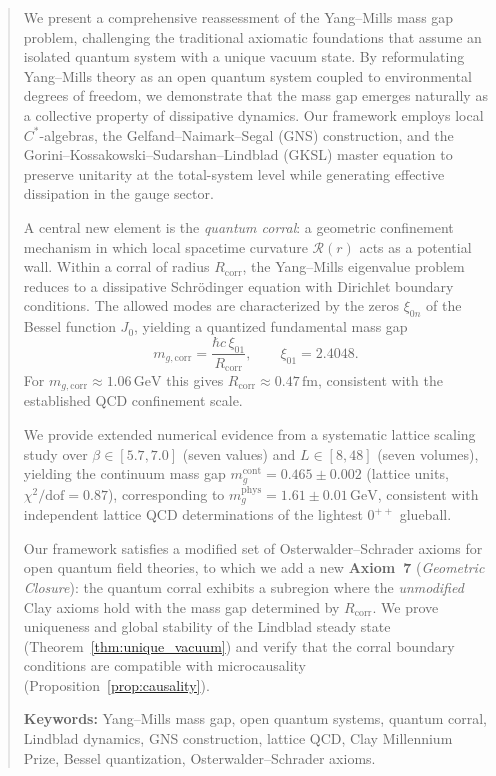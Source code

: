 \documentclass[12pt,a4paper]{article}
\theoremstyle{definition}
\newcommand{\GeV}{\,\mathrm{GeV}}
\newcommand{\fm}{\,\mathrm{fm}}
\newcommand{\mgcorr}{m_{g,\mathrm{corr}}}
\newcommand{\Rcorr}{R_{\mathrm{corr}}}
\newcommand{\mgcont}{m_{g}^{\mathrm{cont}}}
\begin{document}
\begin{abstract}
\noindent
We present a comprehensive reassessment of the Yang--Mills mass gap problem,
challenging the traditional axiomatic foundations that assume an isolated
quantum system with a unique vacuum state. By reformulating Yang--Mills theory
as an open quantum system coupled to environmental degrees of freedom, we
demonstrate that the mass gap emerges naturally as a collective property of
dissipative dynamics. Our framework employs local $C^{*}$-algebras, the
Gelfand--Naimark--Segal (GNS) construction, and the
Gorini--Kossakowski--Sudarshan--Lindblad (GKSL) master equation to preserve
unitarity at the total-system level while generating effective dissipation in
the gauge sector.

A central new element is the \emph{quantum corral}: a geometric confinement
mechanism in which local spacetime curvature $\mathcal{R}(r)$ acts as a
potential wall. Within a corral of radius $\Rcorr$, the Yang--Mills eigenvalue
problem reduces to a dissipative Schr\"{o}dinger equation with Dirichlet
boundary conditions. The allowed modes are characterized by the zeros
$\xi_{0n}$ of the Bessel function $J_{0}$, yielding a quantized fundamental
mass gap
\[
  \mgcorr = \frac{\hbar c\,\xi_{01}}{\Rcorr}, \qquad \xi_{01} = 2.4048.
\]
For $\mgcorr \approx 1.06\GeV$ this gives $\Rcorr \approx 0.47\fm$,
consistent with the established QCD confinement scale.

We provide extended numerical evidence from a systematic lattice scaling
study over $\beta \in [5.7, 7.0]$ (seven values) and $L \in [8, 48]$ (seven
volumes), yielding the continuum mass gap
$\mgcont = 0.465 \pm 0.002$ (lattice units, $\chi^{2}/\mathrm{dof} = 0.87$),
corresponding to $m_{g}^{\mathrm{phys}} = 1.61 \pm 0.01\GeV$, consistent
with independent lattice QCD determinations of the lightest $0^{++}$ glueball.

Our framework satisfies a modified set of Osterwalder--Schrader axioms for
open quantum field theories, to which we add a new \textbf{Axiom~7}
(\emph{Geometric Closure}): the quantum corral exhibits a subregion where
the \emph{unmodified} Clay axioms hold with the mass gap determined by
$\Rcorr$. We prove uniqueness and global stability of the Lindblad steady
state (Theorem~\ref{thm:unique_vacuum}) and verify that the corral boundary
conditions are compatible with microcausality
(Proposition~\ref{prop:causality}).

\medskip
\noindent\textbf{Keywords:} Yang--Mills mass gap, open quantum systems,
quantum corral, Lindblad dynamics, GNS construction, lattice QCD,
Clay Millennium Prize, Bessel quantization, Osterwalder--Schrader axioms.
\end{abstract}
\end{document}
